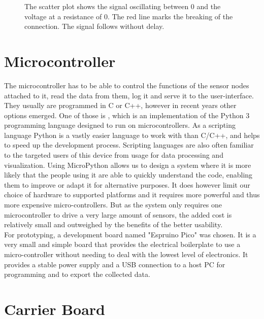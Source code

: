 \begin{figure}[H]
	\begin{center}
		
		\caption[The scatter plot shows the signal oscillating between 0 and the voltage at a resistance of 0.]{The scatter plot shows the signal oscillating between 0 and the voltage at a resistance of 0. The red line marks the breaking of the connection. The signal follows without delay.}
		\label{fig:swnocap}
	\end{center}
\end{figure}

\section{Microcontroller} \label{uc}

The microcontroller has to be able to control the functions of the sensor nodes attached to it, read the data from them, log it and serve it to the user-interface. They usually are programmed in C or C++, however in recent years other options emerged. One of those is \textcite{upy}, which is an implementation of the Python 3 programming language designed to run on microcontrollers. As a scripting language Python is a vastly easier language to work with than C/C++, and helps to speed up the development process. Scripting languages are also often familiar to the targeted users of this device from usage for data processing and visualization. Using MicroPython allows us to design a system where it is more likely that the people using it are able to quickly understand the code, enabling them to improve or adapt it for alternative purposes.
It does however limit our choice of hardware to supported platforms and it requires more powerful and thus more expensive micro-controllers. But as the system only requires one microcontroller to drive a very large amount of sensors, the added cost is relatively small and outweighed by the benefits of the better usability.\\

For prototyping, a development board named "Espruino Pico" was chosen. It is a very small and simple board that provides the electrical boilerplate to use a micro-controller without needing to deal with the lowest level of electronics. It provides a stable power supply and a USB connection to a host PC for programming and to export the collected data.

\section{Carrier Board}

